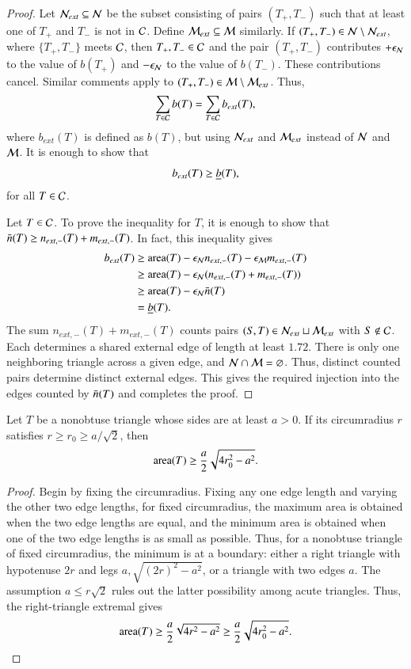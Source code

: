 \begin{proof}
  Let $\mathcal N_{ext}\subseteq \mathcal N$ be the subset consisting of pairs
  $(T_+,T_-)$ such that at least one of $T_+$ and $T_-$ is not in
  $\mathcal C$.  Define $\mathcal M_{ext}\subseteq \mathcal M$ similarly.  If $(T_+,T_-)\in\mathcal N\setminus\mathcal N_{ext}$,
  where $\{T_+,T_-\}$ meets $\mathcal C$, then $T_+,T_-\in\mathcal C$ and the pair $(T_+,T_-)$
  contributes $+\epsilon_{\mathcal N}$ to the value of $b(T_+)$ and $-\epsilon_{\mathcal N}$ to the
  value of $b(T_-)$.  These contributions cancel.  Similar comments
  apply to $(T_+,T_-)\in\mathcal M\setminus \mathcal M_{ext}$.  Thus,
\[
\sum_{T\in \mathcal C} b(T) = \sum_{T\in \mathcal C} b_{ext}(T),
\]
where $b_{ext}(T)$ is defined as $b(T)$, but using $\mathcal N_{ext}$ and
$\mathcal M_{ext}$ instead of $\mathcal N$ and $\mathcal M$. It is enough to show that
\[
b_{ext}(T) \ge \underline{b}(T),
\]
for all $T\in\mathcal C$.

Let $T\in\mathcal C$.  To prove the inequality for $T$, it is enough to show
that $\bar n(T)\ge n_{ext,-}(T)+m_{ext,-}(T)$.  In fact, this inequality gives
\begin{align*}
b_{ext}(T) &\ge {\operatorname{area}}(T) - \epsilon_{\mathcal N} n_{ext,-}(T) - \epsilon_{\mathcal M} m_{ext,-}(T) \\
&\ge {\operatorname{area}}(T) - \epsilon_{\mathcal N} (n_{ext,-}(T)+m_{ext,-}(T)) \\
&\ge {\operatorname{area}}(T) - \epsilon_{\mathcal N} \bar n(T)\\
&= \underline{b}(T).
\end{align*}
The sum $n_{ext,-}(T)+m_{ext,-}(T)$ counts pairs
$(S,T)\in\mathcal N_{ext}\sqcup\mathcal M_{ext}$ with $S\notin\mathcal C$.
Each determines a shared external edge of length at least $1.72$.
There is only one neighboring triangle across a given edge, and
$\mathcal N\cap\mathcal M=\varnothing$.  Thus, distinct counted pairs determine
distinct external edges.  This gives the required injection into
the edges counted by $\bar n(T)$ and completes the proof.
\end{proof}

\begin{lemma}
  Let $T$ be a nonobtuse triangle whose sides are at least $a>0$.
  If its circumradius $r$ satisfies $r\ge r_0\ge a/\sqrt2$, then
  \[
  {\operatorname{area}}(T)\ge\frac {a}2\sqrt{4r_0^2-a^2}.
  \]
\end{lemma}

\begin{proof} Begin by fixing the circumradius.  Fixing any one
  edge length and varying the other two edge lengths, for fixed circumradius, the maximum
  area is obtained when the two edge lengths are equal, and the
  minimum area is obtained when one of the two edge lengths is as
  small as possible.  Thus, for a nonobtuse triangle of fixed circumradius,
  the minimum is at a boundary: either a right triangle with hypotenuse $2r$
  and legs $a,\sqrt{(2r)^2-a^2}$, or a triangle with two edges $a$.
  The assumption $a\le r\sqrt2$ rules out the latter possibility among
  acute triangles.  Thus, the right-triangle extremal gives
     \[
   {\operatorname{area}}(T)\ge\frac {a}2\sqrt{4r^2-a^2}
   \ge\frac {a}2\sqrt{4r_0^2-a^2}.
   \]
\end{proof}

